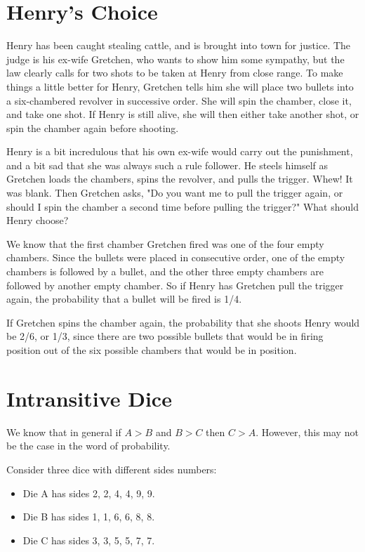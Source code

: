 \hypertarget{Henry-Choice}{%
  \section{Henry's Choice}\label{Henry-Choice}}

Henry has been caught stealing cattle, and is brought into town for justice. The
judge is his ex-wife Gretchen, who wants to show him some sympathy, but the law
clearly calls for two shots to be taken at Henry from close range. To make
things a little better for Henry, Gretchen tells him she will place two bullets
into a six-chambered revolver in successive order. She will spin the chamber,
close it, and take one shot. If Henry is still alive, she will then either take
another shot, or spin the chamber again before shooting.

Henry is a bit incredulous that his own ex-wife would carry out the punishment,
and a bit sad that she was always such a rule follower. He steels himself as
Gretchen loads the chambers, spins the revolver, and pulls the trigger. Whew! It
was blank. Then Gretchen asks, "Do you want me to pull the trigger again, or
should I spin the chamber a second time before pulling the trigger?" What should Henry choose?

We know that the first chamber Gretchen fired was one of the four empty
chambers. Since the bullets were placed in consecutive order, one of the empty
chambers is followed by a bullet, and the other three empty chambers are
followed by another empty chamber. So if Henry has Gretchen pull the trigger
again, the probability that a bullet will be fired is 1/4.

If Gretchen spins the chamber again, the probability that she shoots Henry would
be 2/6, or 1/3, since there are two possible bullets that would be in firing
position out of the six possible chambers that would be in position.

\hypertarget{Intransitive-Dice}{%
\section{Intransitive Dice}\label{Intransitive-Dice}}

We know that in general if $A>B$ and $B>C$ then $C>A$. However, this may not be the case in the word of probability.

Consider three dice with different sides numbers:
\begin{itemize}
\item Die A has sides 2, 2, 4, 4, 9, 9.
\item Die B has sides 1, 1, 6, 6, 8, 8.
\item Die C has sides 3, 3, 5, 5, 7, 7.
\end{itemize}

